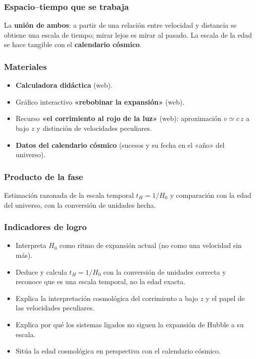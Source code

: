 \subsubsection*{Espacio--tiempo que se trabaja}

La \textbf{unión de ambos}: a partir de una relación entre velocidad y distancia se obtiene una escala de tiempo; mirar lejos es mirar al pasado. La escala de la edad se hace tangible con el \textbf{calendario cósmico}.

\subsubsection*{Materiales}

\begin{itemize}
\item \textbf{Calculadora didáctica} (web).
\item Gráfico interactivo \textbf{«rebobinar la expansión»} (web).
\item Recurso \textbf{«el corrimiento al rojo de la luz»} (web): aproximación $v\simeq c\,z$ a bajo $z$ y distinción de velocidades peculiares.
\item \textbf{Datos del calendario cósmico} (sucesos y su fecha en el «año» del universo).
\end{itemize}

\subsubsection*{Producto de la fase}

Estimación razonada de la escala temporal $t_H=1/H_0$ y comparación con la edad del universo, con la conversión de unidades hecha.

\subsubsection*{Indicadores de logro}

\begin{itemize}
\item Interpreta $H_{0}$ como ritmo de expansión actual (no como una velocidad sin más).
\item Deduce y calcula $t_H = 1/H_{0}$ con la conversión de unidades correcta y reconoce que es una escala temporal, no la edad exacta.
\item Explica la interpretación cosmológica del corrimiento a bajo $z$ y el papel de las velocidades peculiares.
\item Explica por qué los sistemas ligados no siguen la expansión de Hubble a su escala.
\item Sitúa la edad cosmológica en perspectiva con el calendario cósmico.
\end{itemize}

